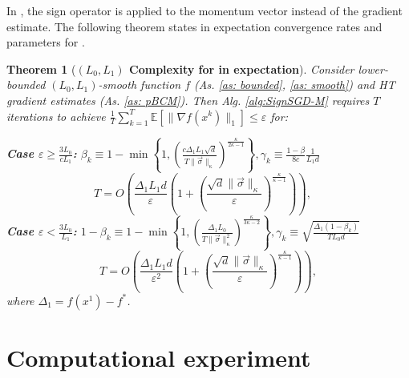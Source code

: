 \documentclass[12pt]{article}
\newcommand{\EE}{\mathbb{E}}
\newtheorem{theorem}{Theorem}
\begin{document}
In , the sign operator is applied to the momentum vector instead of the gradient estimate. The following theorem states in expectation convergence rates and parameters for .  

\begin{theorem}[\textbf{$(L_0, L_1)$ Complexity for  in expectation}]
Consider lower-bounded $(L_0,L_1)$-smooth function $f$ (As. \ref{as: bounded}, \ref{as: smooth}) and HT gradient estimates (As. \ref{as: pBCM}). Then Alg. \ref{alg:SignSGD-M} requires $T$ iterations  to achieve  $\frac{1}{T} \sum_{k=1}^{T}  \EE \left[ \|\nabla f(x^k)\|_1 \right]  \leq \varepsilon$ for:

\textbf{Case $\varepsilon \geq \frac{3L_0}{cL_1}$:} $\beta_k \equiv 1 - \min\left\{1, \left(\frac{c\Delta_1 L_1 \sqrt{d}}{T \|\Vec{\sigma}\|_\kappa}\right)^\frac{\kappa}{2\kappa - 1}\right\}, \gamma_k  \equiv \frac{1 - \beta}{8c} \frac{1}{L_1d}$ 
\begin{equation}
     T = O\left(\frac{\Delta_1L_1d}{\varepsilon } \left(1 + \left(\frac{\sqrt{d}\|\Vec{\sigma}\|_\kappa}{\varepsilon}\right)^\frac{\kappa }{\kappa  -1}\right)\right), \quad
\end{equation}
\textbf{Case $\varepsilon < \frac{3L_0}{L_1}$:} $1  - \beta_k \equiv   1 - \min\left\{1, \left(\frac{\Delta_1 L_0}{T \|\Vec{\sigma}\|_\kappa^2}\right)^\frac{\kappa}{3\kappa - 2}  \right\}, \gamma_k  \equiv \sqrt{\frac{\Delta_1 (1 - \beta_k)}{T L_0 d}}$ 
\begin{equation}
     T = O\left(\frac{\Delta_1L_1d}{\varepsilon^2 } \left(1 + \left(\frac{\sqrt{d}\|\Vec{\sigma}\|_\kappa}{\varepsilon}\right)^\frac{\kappa }{\kappa  -1}\right)\right),
\end{equation}
where $\Delta_1 = f(x^1) - f^*$.
\end{theorem}

\section{Computational experiment}
\end{document}
